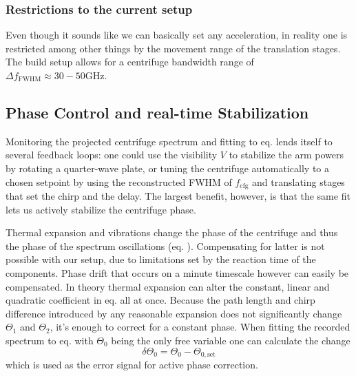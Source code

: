 \subsubsection{Restrictions to the current setup}
Even though it sounds like we can basically set any acceleration, in reality one is restricted among other things by the movement range of the translation stages. The build setup allows for a centrifuge bandwidth range of $\Delta f_{\mathrm{FWHM}} \approx 30-50 \mathrm{GHz}$.


\subsection{Phase Control and real-time Stabilization}
Monitoring the projected centrifuge spectrum and fitting to eq.  lends itself to several feedback loops: one could use the visibility $V$ to stabilize the arm powers by rotating a quarter-wave plate, or tuning the centrifuge automatically to a chosen setpoint by using the reconstructed FWHM of $f_\mathrm{cfg}$  and translating stages that set the chirp and the delay. The largest benefit, however, is that the same fit lets us actively stabilize the centrifuge phase.

Thermal expansion and vibrations change the phase of the centrifuge and thus the phase of the spectrum oscillations (eq. ). Compensating for latter is not possible with our setup, due to limitations set by the reaction time of the components. Phase drift that occurs on a minute timescale however can easily be compensated. In theory thermal expansion can alter the constant, linear and quadratic coefficient in eq.  all at once. Because the path length and chirp difference introduced by any reasonable expansion does not significantly change $\Theta_1$ and $\Theta_2$, it's enough to correct for a constant phase. When fitting the recorded spectrum to eq.  with $\Theta_0$ being the only free variable one can calculate the change
\begin{equation}
    \delta\Theta_0
=
\Theta_0-\Theta_{0,\mathrm{set}}
\end{equation}
which is used as the error signal for active phase correction.

